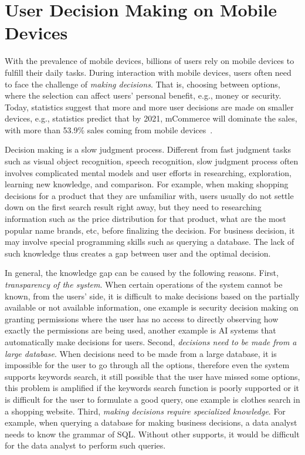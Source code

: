 
\section{User Decision Making on Mobile Devices}
\label{ch1:sec2:motiv}

With the prevalence of mobile devices, billions of users rely on mobile devices to fulfill their daily tasks. During interaction with mobile devices, users often need to face the challenge of \emph{making decisions}. That is, choosing between options, where the selection can affect users' personal benefit, e.g., money or security. Today, statistics suggest that more and more user decisions are made on smaller devices, e.g., statistics predict that by 2021, mCommerce will dominate the sales, with more than 53.9\% sales coming from mobile devices~\cite{mcommerce53}.

Decision making is a slow judgment process. Different from fast judgment tasks such as visual object recognition, speech recognition, slow judgment process often involves complicated mental models and user efforts in researching, exploration, learning new knowledge, and comparison. For example, when making shopping decisions for a product that they are unfamiliar with, users usually do not settle down on the first search result right away, but they need to researching information such as the price distribution for that product, what are the most popular name brands, etc, before finalizing the decision. For business decision, it may involve special programming skills such as querying a database. The lack of such knowledge thus creates a gap between user and the optimal decision. 

In general, the knowledge gap can be caused by the following reasons. First, \emph{transparency of the system}. When certain operations of the system cannot be known, from the users' side, it is difficult to make decisions based on the partially available or not available information, one example is security decision making on granting permissions where the user has no access to directly observing how exactly the permissions are being used, another example is AI systems that automatically make decisions for users. Second, \emph{decisions need to be made from a large database}. When decisions need to be made from a large database, it is impossible for the user to go through all the options, therefore even the system supports keywords search, it still possible that the user have missed some options, this problem is amplified if the keywords search function is poorly supported or it is difficult for the user to formulate a good query, one example is clothes search in a shopping website. Third, \emph{making decisions require specialized knowledge}. For example, when querying a database for making business decisions, a data analyst needs to know the grammar of SQL. Without other supports, it would be difficult for the data analyst to perform such queries. 

